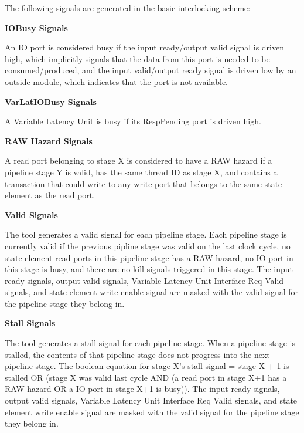 The following signals are generated in the basic interlocking scheme:

{\bf IOBusy Signals}

An IO port is considered busy if the input ready/output valid signal is driven high, which implicitly signals that the data from this port is needed to be consumed/produced, and the input valid/output ready signal is driven low by an outside module, which indicates that the port is not available.


{\bf VarLatIOBusy Signals}

A Variable Latency Unit is busy if its RespPending port is driven high.


{\bf RAW Hazard Signals}

A read port belonging to stage X is considered to have a RAW hazard if a pipeline stage Y is valid, has the same thread ID as stage X, and contains a transaction that could write to any write port that belongs to the same state element as the read port.


{\bf Valid Signals}

The tool generates a valid signal for each pipeline stage. Each pipeline stage is currently valid if the previous pipline stage was valid on the last clock cycle, no state element read ports in this pipeline stage has a RAW hazard, no IO port in this stage is busy, and there are no kill signals triggered in this stage. The input ready signals, output valid signals, Variable Latency Unit Interface Req Valid signals, and state element write enable signal are masked with the valid signal for the pipeline stage they belong in.


{\bf Stall Signals}

The tool generates a stall signal for each pipeline stage. When a pipeline stage is stalled, the contents of that pipeline stage does not progress into the next pipeline stage. The boolean equation for stage X's stall signal = stage X + 1 is stalled OR (stage X was valid last cycle AND (a read port in stage X+1 has a RAW hazard OR a IO port in stage X+1 is busy)). The input ready signals, output valid signals, Variable Latency Unit Interface Req Valid signals, and state element write enable signal are masked with the valid signal for the pipeline stage they belong in. 


